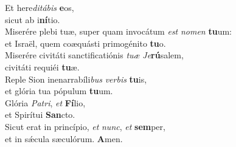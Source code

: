 \oddverse Et here\textit{di}\textit{tá}\textit{bis} \textbf{e}os,~\*\\
\oddverse sicut ab i\textbf{ní}tio.\\
\evenverse Miserére plebi tuæ, super quam invocátum \textit{est} \textit{no}\textit{men} \textbf{tu}um:~\*\\
\evenverse et Israël, quem coæquásti primogénito \textbf{tu}o.\\
\oddverse Miserére civitáti sanctificatiónis \textit{tu}\textit{æ} \textit{Je}\textbf{rú}salem,~\*\\
\oddverse civitáti requiéi \textbf{tu}æ.\\
\evenverse Reple Sion inenarrabíli\textit{bus} \textit{ver}\textit{bis} \textbf{tu}is,~\*\\
\evenverse et glória tua pópulum \textbf{tu}um.\\
\oddverse Glória \textit{Pa}\textit{tri}, \textit{et} \textbf{Fí}lio,~\*\\
\oddverse et Spirítui \textbf{San}cto.\\
\evenverse Sicut erat in princípio, \textit{et} \textit{nunc}, \textit{et} \textbf{sem}per,~\*\\
\evenverse et in sǽcula sæculórum. \textbf{A}men.\\
